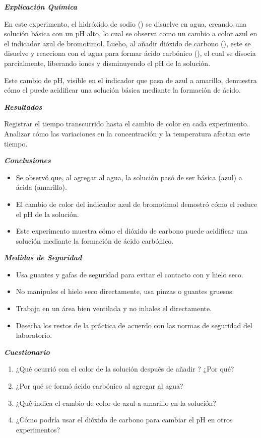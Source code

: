    \textit{\textbf{Explicación Química }}  

    En este experimento, el hidróxido de sodio () se disuelve en agua, creando una solución básica con un pH alto, lo cual se observa como un cambio a color azul en el indicador azul de bromotimol. Lueho, al añadir dióxido de carbono (), este se disuelve y reacciona con el agua para formar ácido carbónico (), el cual se disocia parcialmente, liberando iones  y disminuyendo el pH de la solución.

    Este cambio de pH, visible en el indicador que pasa de azul a amarillo, demuestra cómo el  puede acidificar una solución básica mediante la formación de ácido.
    
    \textit{\textbf{Resultados }} 
    
    Registrar el tiempo transcurrido hasta el cambio de color en cada experimento. Analizar cómo las variaciones en la concentración y la temperatura afectan este tiempo.  

    \clearpage
    
    \textit{\textbf{Conclusiones}}  
    \begin{itemize}
        \item Se observó que, al agregar  al agua, la solución pasó de ser básica (azul) a ácida (amarillo).
        \item El cambio de color del indicador azul de bromotimol demostró cómo el  reduce el pH de la solución.
        \item Este experimento muestra cómo el dióxido de carbono puede acidificar una solución mediante la formación de ácido carbónico.
    \end{itemize}
    
    \textit{\textbf{Medidas de Seguridad }} 
    \begin{itemize}
        \item Usa guantes y gafas de seguridad para evitar el contacto con  y hielo seco.
        \item No manipules el hielo seco directamente, usa pinzas o guantes gruesos. 
        \item Trabaja en un área bien ventilada y no inhales el  directamente.
        \item Desecha los restos de la práctica de acuerdo con las normas de seguridad del laboratorio.
    \end{itemize}

    \textit{\textbf{Cuestionario}} 
    \begin{enumerate}
        \item ¿Qué ocurrió con el color de la solución después de añadir ? ¿Por qué?
        \item ¿Por qué se formó ácido carbónico al agregar  al agua?
        \item ¿Qué indica el cambio de color de azul a amarillo en la solución?
        \item ¿Cómo podría usar el dióxido de carbono para cambiar el pH en otros experimentos?
    \end{enumerate}
    \newpage
